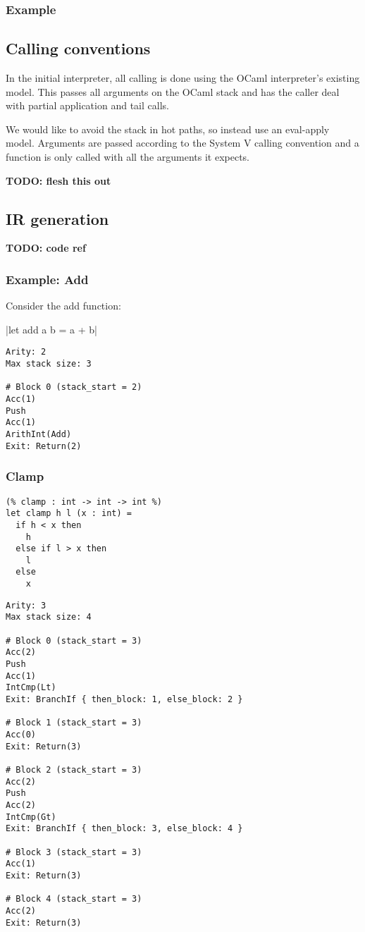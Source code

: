\subsubsection{Example}

\subsection{Calling conventions}

In the initial interpreter, all calling is done using the OCaml interpreter's existing model. This
passes all arguments on the OCaml stack and has the caller deal with partial application and tail
calls.

We would like to avoid the stack in hot paths, so instead use an eval-apply model. Arguments are
passed according to the System V calling convention and a function is only called with all the
arguments it expects.

\textbf{TODO: flesh this out}

\subsection{IR generation} \label{opt-irgen}

\textbf{TODO: code ref}

\subsubsection{Example: Add}

Consider the add function:

|let add a b = a + b|

\begin{verbatim}
Arity: 2
Max stack size: 3

# Block 0 (stack_start = 2)
Acc(1)
Push
Acc(1)
ArithInt(Add)
Exit: Return(2)
\end{verbatim}

\subsubsection{Clamp}

\begin{verbatim}
(% clamp : int -> int -> int %)
let clamp h l (x : int) =
  if h < x then
    h
  else if l > x then
    l
  else
    x
\end{verbatim}

\begin{verbatim}
Arity: 3
Max stack size: 4

# Block 0 (stack_start = 3)
Acc(2)
Push
Acc(1)
IntCmp(Lt)
Exit: BranchIf { then_block: 1, else_block: 2 }

# Block 1 (stack_start = 3)
Acc(0)
Exit: Return(3)

# Block 2 (stack_start = 3)
Acc(2)
Push
Acc(2)
IntCmp(Gt)
Exit: BranchIf { then_block: 3, else_block: 4 }

# Block 3 (stack_start = 3)
Acc(1)
Exit: Return(3)

# Block 4 (stack_start = 3)
Acc(2)
Exit: Return(3)
\end{verbatim}

